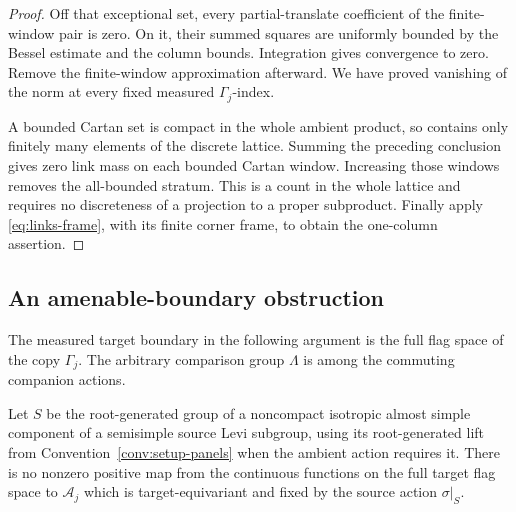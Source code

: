 \begin{proof}
Off that exceptional set, every partial-translate coefficient of
the finite-window pair is zero. On it, their summed squares are
uniformly bounded by the Bessel estimate and the column bounds.
Integration gives convergence to zero. Remove the finite-window
approximation afterward. We have proved vanishing of the norm
at every fixed measured \(\Gamma_j\)-index.

A bounded Cartan set is compact in the whole ambient product, so
contains only finitely many elements of the discrete lattice.
Summing the preceding conclusion gives zero link mass on each
bounded Cartan window. Increasing those windows removes the
all-bounded stratum. This is a count in the whole lattice and
requires no discreteness of a projection to a proper subproduct.
Finally apply \eqref{eq:links-frame}, with its finite corner
frame, to obtain the one-column assertion.
\end{proof}

\subsection{An amenable-boundary obstruction}

The measured target boundary in the following argument is the full flag
space of the copy \(\Gamma_j\). The arbitrary comparison group
\(\Lambda\) is among the commuting companion actions.

\begin{lemma}
\label{lem:links-obstruction}
Let \(S\) be the root-generated group of a noncompact isotropic
almost simple component of a semisimple source Levi subgroup, using
its root-generated lift from Convention~\ref{conv:setup-panels} when
the ambient action requires it. There is no nonzero positive map from the
continuous functions on the full target flag space to
\(\mathcal A_j\) which is target-equivariant and fixed by the source
action \(\sigma|_S\).
\end{lemma}

